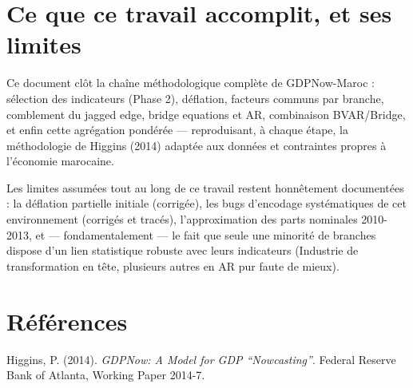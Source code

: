 \documentclass[11pt,a4paper]{article}
\begin{document}
\section{Ce que ce travail accomplit, et ses limites}

\begin{resultatbox}
Ce document clôt la chaîne méthodologique complète de GDPNow-Maroc : sélection des indicateurs (Phase 2), déflation, facteurs communs par branche, comblement du jagged edge, bridge equations et AR, combinaison BVAR/Bridge, et enfin cette agrégation pondérée --- reproduisant, à chaque étape, la méthodologie de Higgins (2014) adaptée aux données et contraintes propres à l'économie marocaine.
\end{resultatbox}

Les limites assumées tout au long de ce travail restent honnêtement documentées : la déflation partielle initiale (corrigée), les bugs d'encodage systématiques de cet environnement (corrigés et tracés), l'approximation des parts nominales 2010-2013, et --- fondamentalement --- le fait que seule une minorité de branches dispose d'un lien statistique robuste avec leurs indicateurs (Industrie de transformation en tête, plusieurs autres en AR pur faute de mieux).

\section*{Références}
\begin{enumerate}[leftmargin=1.6em, label=\textbf{[\arabic*]}]
\item \hypertarget{ref1}{} Higgins, P. (2014). \textit{GDPNow: A Model for GDP ``Nowcasting''}. Federal Reserve Bank of Atlanta, Working Paper 2014-7.
\end{enumerate}
\end{document}
